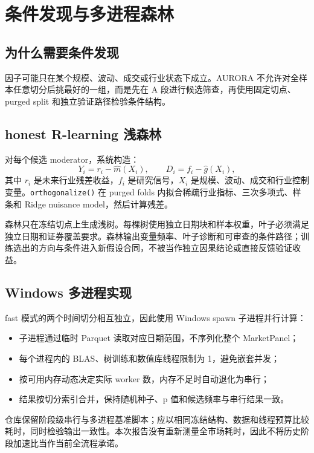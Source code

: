 \documentclass[11pt,a4paper]{article}
\newcommand{\code}[1]{\texttt{#1}}
\begin{document}
\section{条件发现与多进程森林}
\subsection{为什么需要条件发现}
因子可能只在某个规模、波动、成交或行业状态下成立。AURORA 不允许对全样本任意切分后挑最好的一组，而是先在 A 段进行候选筛查，再使用固定切点、purged split 和独立验证路径检验条件结构。

\subsection{honest R-learning 浅森林}
对每个候选 moderator，系统构造：
\begin{equation}
Y_i = r_i - \widehat{m}(X_i), \qquad D_i = f_i - \widehat{g}(X_i),
\end{equation}
其中 $r_i$ 是未来行业残差收益，$f_i$ 是研究信号，$X_i$ 是规模、波动、成交和行业控制变量。\code{orthogonalize()} 在 purged folds 内拟合稀疏行业指标、三次多项式、样条和 Ridge nuisance model，然后计算残差。

森林只在冻结切点上生成浅树。每棵树使用独立日期块和样本权重，叶子必须满足独立日期和证券覆盖要求。森林输出变量频率、叶子诊断和可审查的条件路径；训练选出的方向与条件进入新假设合同，不被当作独立因果结论或直接反馈验证收益。

\subsection{Windows 多进程实现}
fast 模式的两个时间切分相互独立，因此使用 Windows spawn 子进程并行计算：
\begin{itemize}[leftmargin=2em]
  \item 子进程通过临时 Parquet 读取对应日期范围，不序列化整个 MarketPanel；
  \item 每个进程内的 BLAS、树训练和数值库线程限制为 1，避免嵌套并发；
  \item 按可用内存动态决定实际 worker 数，内存不足时自动退化为串行；
  \item 结果按切分索引合并，保持随机种子、p 值和候选频率与串行结果一致。
\end{itemize}

仓库保留阶段级串行与多进程基准脚本；应以相同冻结结构、数据和线程预算比较耗时，同时检验输出一致性。本次报告没有重新测量全市场耗时，因此不将历史阶段加速比当作当前全流程承诺。
\end{document}
